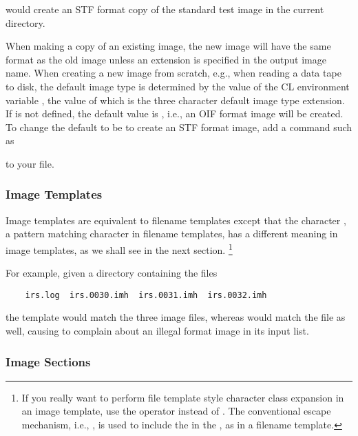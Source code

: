 \noindent
would create an STF format copy of the standard test image in the current
directory.

When making a copy of an existing image, the new image will have the same
format as the old image unless an extension is specified in the output image
name.  When creating a new image from scratch, e.g., when reading a data
tape to disk, the default image type is determined by the value of the CL
environment variable , the value of which is the three
character default image type extension.  If  is not defined,
the default value is , i.e., an OIF format image will be
created.  To change the default to be to create an STF format image, add
a command such as

\begin{quotation}\noindent
{} 
\end{quotation}

\noindent
to your  file.

\subsubsection{Image Templates}

\ppind
Image templates are equivalent to filename templates except that the character
\comptype{`['}, a pattern matching character in filename templates, has a
different meaning in image templates, as we shall see in the next section.
\footnote {If you really want to perform file template style character class
expansion in an image template, use the operator \comptype{![} instead
of \comptype{[}.  The conventional escape mechanism, i.e., \comptype{\bsl[},
is used to include the \comptype{[} in the , as in a
filename template.}

\noindent
For example, given a directory containing the files

\begin{verbatim}
    irs.log  irs.0030.imh  irs.0031.imh  irs.0032.imh
\end{verbatim}

\noindent
the template  would match the three image files,
whereas  would match the  file as well,
causing  to complain about an illegal format image in
its input list.

\subsubsection{Image Sections}

